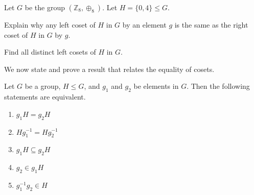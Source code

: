 \begin{exercise}
    Let $G$ be the group $(\mathbb{Z}_8, \oplus_8)$. Let $H = \{0, 4\} \leq G$.
    \begin{partquestions}{\alph*}
        \item Explain why any left coset of $H$ in $G$ by an element $g$ is the same as the right coset of $H$ in $G$ by $g$.
        \item Find all distinct left cosets of $H$ in $G$.
    \end{partquestions}
\end{exercise}

We now state and prove a result that relates the equality of cosets.
\begin{lemma}\label{lemma-coset-equality}
    Let $G$ be a group, $H \leq G$, and $g_1$ and $g_2$ be elements in $G$. Then the following statements are equivalent.
    \begin{enumerate}[label=$(\arabic*)$]
        \item $g_1H = g_2H$
        \item $Hg_1^{-1} = Hg_2^{-1}$
        \item $g_1H \subseteq g_2H$
        \item $g_2 \in g_1H$
        \item $g_1^{-1}g_2 \in H$
    \end{enumerate}
\end{lemma}
